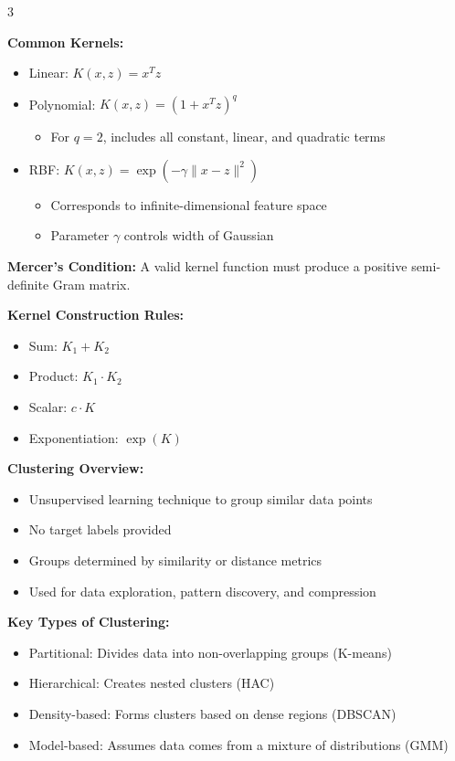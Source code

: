 \documentclass[10pt,landscape]{article}
\begin{document}
\begin{multicols}{3}
\begin{tcolorbox}[breakable, title=4.2 The Kernel Trick, colback=svm]
\textbf{Common Kernels:}
\begin{itemize}[leftmargin=*,noitemsep,topsep=0pt]
    \item Linear: $K(x,z) = x^Tz$
    \item Polynomial: $K(x,z) = (1 + x^Tz)^q$
    \begin{itemize}[leftmargin=*,noitemsep]
        \item For $q=2$, includes all constant, linear, and quadratic terms
    \end{itemize}
    \item RBF: $K(x,z) = \exp(-\gamma\|x-z\|^2)$
    \begin{itemize}[leftmargin=*,noitemsep]
        \item Corresponds to infinite-dimensional feature space
        \item Parameter $\gamma$ controls width of Gaussian
    \end{itemize}
\end{itemize}

\textbf{Mercer's Condition:} A valid kernel function must produce a positive semi-definite Gram matrix.

\textbf{Kernel Construction Rules:}
\begin{itemize}[leftmargin=*,noitemsep,topsep=0pt]
    \item Sum: $K_1 + K_2$
    \item Product: $K_1 \cdot K_2$
    \item Scalar: $c \cdot K$
    \item Exponentiation: $\exp(K)$
\end{itemize}
\end{tcolorbox}

\begin{tcolorbox}[breakable, title=5. Clustering Concepts, colback=clustering]
\textbf{Clustering Overview:}
\begin{itemize}[leftmargin=*,noitemsep,topsep=0pt]
    \item Unsupervised learning technique to group similar data points
    \item No target labels provided
    \item Groups determined by similarity or distance metrics
    \item Used for data exploration, pattern discovery, and compression
\end{itemize}

\textbf{Key Types of Clustering:}
\begin{itemize}[leftmargin=*,noitemsep,topsep=0pt]
    \item Partitional: Divides data into non-overlapping groups (K-means)
    \item Hierarchical: Creates nested clusters (HAC)
    \item Density-based: Forms clusters based on dense regions (DBSCAN)
    \item Model-based: Assumes data comes from a mixture of distributions (GMM)
\end{itemize}


\end{tcolorbox}
\end{multicols}
\end{document}
